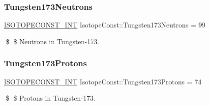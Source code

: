 \subsubsection{\texorpdfstring{Tungsten173\+Neutrons}{Tungsten173Neutrons}}
{\footnotesize\ttfamily \mbox{\hyperlink{group___isotope_const-_macros_ga5f18360b3e99483a35c32d789e62621c}{I\+S\+O\+T\+O\+P\+E\+C\+O\+N\+S\+T\+\_\+\+I\+NT}} Isotope\+Const\+::\+Tungsten173\+Neutrons = 99}

\$ \$ Neutrons in Tungsten-\/173. \mbox{\label{group___isotope_const-_tungsten-_w173_ga7fffac6a3f5b8830c28558d6480857ab}} 
\subsubsection{\texorpdfstring{Tungsten173\+Protons}{Tungsten173Protons}}
{\footnotesize\ttfamily \mbox{\hyperlink{group___isotope_const-_macros_ga5f18360b3e99483a35c32d789e62621c}{I\+S\+O\+T\+O\+P\+E\+C\+O\+N\+S\+T\+\_\+\+I\+NT}} Isotope\+Const\+::\+Tungsten173\+Protons = 74}

\$ \$ Protons in Tungsten-\/173. 